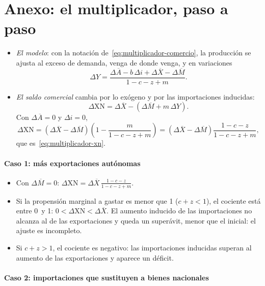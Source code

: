 \documentclass[11pt]{article}
\begin{document}
\section{Anexo: el multiplicador, paso a paso}\label{anexo:multiplicador}

\begin{itemize}
\item \emph{El modelo}: con la notación de~\eqref{eq:multiplicador-comercio}, la producción se ajusta al exceso de demanda, venga de donde venga, y en variaciones
  \[
  \Delta Y=\frac{\Delta\overline A-b\,\Delta i+\Delta\overline X-\Delta\overline M}{1-c-z+m}.
  \]
\item \emph{El saldo comercial} cambia por lo exógeno y por las importaciones inducidas:
  \[
  \Delta\mathrm{XN}=\Delta\overline X-\left(\Delta\overline M+m\,\Delta Y\right).
  \]
  Con $\Delta\overline A=0$ y $\Delta i=0$,
  \[
  \Delta\mathrm{XN}=\left(\Delta\overline X-\Delta\overline M\right)\left(1-\frac{m}{1-c-z+m}\right)=\left(\Delta\overline X-\Delta\overline M\right)\frac{1-c-z}{1-c-z+m},
  \]
  que es~\eqref{eq:multiplicador-xn}. \findemo
\end{itemize}

\paragraph{Caso 1: más exportaciones autónomas}

\begin{itemize}
\item Con $\Delta\overline M=0$: $\Delta\mathrm{XN}=\Delta\overline X\,\frac{1-c-z}{1-c-z+m}$.
\item Si la propensión marginal a gastar es menor que 1 ($c+z<1$), el cociente está entre 0~y 1: $0<\Delta\mathrm{XN}<\Delta\overline X$. El aumento inducido de las importaciones no alcanza al de las exportaciones y queda un superávit, menor que el inicial: el ajuste es incompleto.
\item Si $c+z>1$, el cociente es negativo: las importaciones inducidas superan al aumento de las exportaciones y aparece un déficit.
\end{itemize}

\paragraph{Caso 2: importaciones que sustituyen a bienes nacionales}
\end{document}
